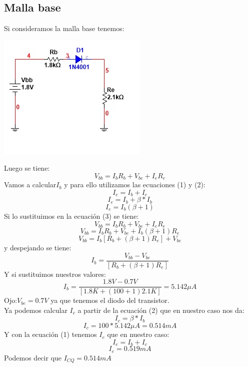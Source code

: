 \documentclass[10pt,a4paper]{article}
\begin{document}
\subsection{Malla base}
Si consideramos la malla base tenemos:
\begin{center}
\includegraphics[scale=1]{Images/Imagen6.jpg}
\end{center}
Luego se tiene:
\begin{equation}
V_{bb}=I_{b}R_{b}+V_{be}+I_{e}R_{e}
\end{equation}
Vamos a calcular$I_{b}$ y para ello utilizamos las ecuaciones (1) y (2):
\[I_{e}=I_{b}+I_{c}\]
\[I_{e}=I_{b}+\beta*I_{b}\]
\[I_{e}=I_{b}(\beta+1)\]
Si lo sustituimos en la ecuación (3) se tiene:
\[V_{bb}=I_{b}R_{b}+V_{be}+I_{e}R_{e}\]
\[V_{bb}=I_{b}R_{b}+V_{be}+I_{b}(\beta+1)R_{e}\]
\[V_{bb}=I_{b}[R_{b}+(\beta+1)R_{e}]+V_{be}\]
y despejando se tiene:
\[I_{b}=\frac{V_{bb}-V_{be}}{[R_{b}+(\beta+1)R_{e}]}\]
Y si sustituimos nuestros valores:
\[I_{b}=\frac{1.8V-0.7V}{[1.8K+(100+1)2.1K]}=5.142 \mu A\]
Ojo:$V_{be}=0.7V$ ya que tenemos el diodo del transistor.
\\ 
Ya podemos calcular $I_{c}$ a partir de la ecuación (2) que en nuestro caso nos da:
\[I_{c}=\beta*I_{b}\]
\[I_{c}=100*5.142 \mu A= 0.514 mA\]
Y  con la ecuación (1) tenemos $I_{e}$ que en nuestro caso:
\[I_{e}=I_{b}+I_{c}\]
\[I_{e}=0.519 mA\]
Podemos decir que $I_{CQ}=0.514 mA$
\end{document}
